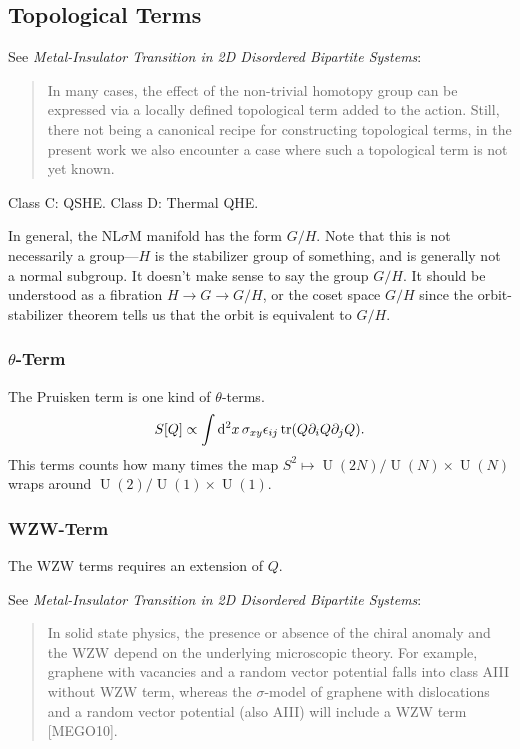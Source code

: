 \documentclass{article}
\begin{document}
\subsection{Topological Terms}

See \textit{Metal-Insulator Transition in 2D
Disordered Bipartite Systems}:
\begin{quotation}
    In many cases, the effect of the non-trivial homotopy group can be expressed via a locally defined topological term added to the action. Still, there not being a canonical recipe for constructing topological terms, in the present work we also encounter a case where such a topological term is not yet known.
\end{quotation}

Class C: QSHE. Class D: Thermal QHE.

In general, the NL$\sigma$M manifold has the form $G/H$.
\begingroup
\color{red}
Note that this is not necessarily a group---$H$ is the stabilizer group of something, and is generally not a normal subgroup.
It doesn't make sense to say the group $G/H$.
It should be understood as a fibration $H\rightarrow G \rightarrow G/H$, or the coset space $G/H$ since the orbit-stabilizer theorem tells us that the orbit is equivalent to $G/H$.
\endgroup

\subsubsection{\texorpdfstring{$\theta$-Term}{Theta-Term}}

The Pruisken term is one kind of $\theta$-terms.
\[ S[Q] \propto \int \dd[2]{x} \sigma_{xy} \epsilon_{ij}\tr(Q \partial_i Q \partial_j Q). \]
This terms counts how many times the map $S^2\mapsto \operatorname{U}(2N)/\operatorname{U}(N)\times \operatorname{U}(N)$ wraps around $\operatorname{U}(2)/\operatorname{U}(1)\times \operatorname{U}(1)$.

\subsubsection{WZW-Term}

The WZW terms requires an extension of $Q$.

See \textit{Metal-Insulator Transition in 2D
Disordered Bipartite Systems}:
\begin{quotation}
    In solid state physics, the presence or absence of the chiral anomaly and the WZW depend
    on the underlying microscopic theory. For example, graphene with vacancies and a random
    vector potential falls into class AIII without WZW term, whereas the $\sigma$-model of graphene
    with dislocations and a random vector potential (also AIII) will include a WZW term
[MEGO10].
\end{quotation}
\end{document}
